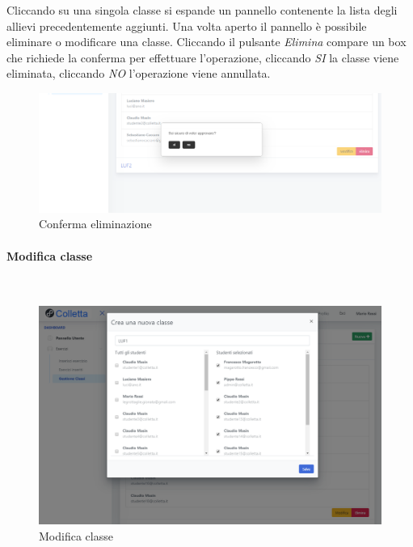  Cliccando su una singola classe si espande un pannello contenente la lista degli allievi precedentemente aggiunti.
Una volta aperto il pannello è possibile eliminare o modificare una classe.
Cliccando il pulsante \textit{Elimina} compare un box che richiede la conferma per effettuare l'operazione, cliccando \textit{SI} la classe viene eliminata, cliccando \textit{NO} l'operazione viene annullata.
 \begin{figure}[H]
            	\centering
        		\includegraphics[width=17cm]{sez/img/insegnante/confermaElimina.png} 
            	\caption{Conferma eliminazione}\label{fig:1}
        	\end{figure}
     
       
       \newpage
         \paragraph{Modifica classe}\mbox{}\\	      
        
         \begin{figure}[H]
            	\centering
        		\includegraphics[width=17cm]{sez/img/insegnante/modificaclasse.PNG} 
            	\caption{Modifica classe}\label{fig:1}
        	\end{figure}
        	
